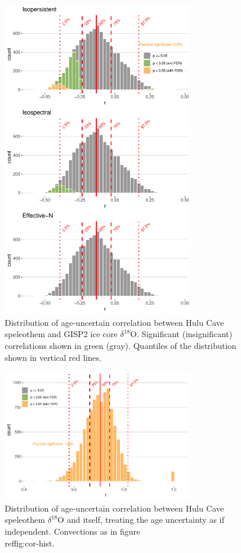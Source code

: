 \documentclass[gchron, manuscript]{copernicus}
\begin{document}
\begin{figure}
\includegraphics[width=8.3cm]{geoChronR-paper_files/figure-latex/cor-hist-1} \caption{Distribution of age-uncertain correlation between Hulu Cave speleothem and GISP2 ice core $\delta^{18}$O. Significant (insignificant) correlations shown in green (gray).  Quantiles of the distribution shown in vertical red lines.}\label{fig:cor-hist}
\end{figure}

\begin{figure}
\includegraphics[width=8.3cm]{geoChronR-paper_files/figure-latex/hulu-cor-hist-1} \caption{Distribution of age-uncertain correlation between Hulu Cave speleothem $\delta^{18}$O and itself, treating the age uncertainty as if independent. Convections as in figure \\ref{fig:cor-hist}.}\label{fig:hulu-cor-hist}
\end{figure}
\end{document}
